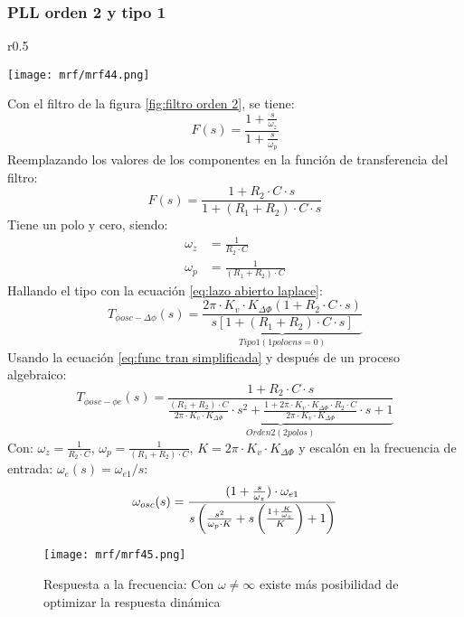 \documentclass[
	12pt, %
	fleqn, %
	a4paper, %
	oneside, %
]{LegrandOrangeBook}
\begin{document}
\subsubsection{PLL orden 2 y tipo 1}
\begin{wrapfigure}{r}{0.5\linewidth}
  \begin{center}
    \texttt{[image: mrf/mrf44.png]}
  \end{center}
  \caption{Filtro orden 2.}
  \label{fig:filtro orden 2}
\end{wrapfigure}
Con el filtro de la figura \ref{fig:filtro orden 2}, se tiene:
\begin{displaymath}
F(s)=\frac{1+\frac{s}{\omega_z}}{1+\frac{s}{\omega_p}}
\end{displaymath}
Reemplazando los valores de los componentes en la función de transferencia del filtro:
\begin{displaymath}
F(s)=\frac{1+R_2\cdot C\cdot s}{1+(R_1+R_2)\cdot C\cdot s}
\end{displaymath}
Tiene un polo y cero, siendo:
\begin{align*}
\omega_z&=\frac{1}{R_2\cdot C}\\
\omega_p&=\frac{1}{(R_1+R_2)\cdot C}
\end{align*}
Hallando el tipo con la ecuación \ref{eq:lazo abierto laplace}:
\begin{displaymath}
T_{\phi osc-\Delta\phi}(s)=\underbrace{\frac{2\pi\cdot K_v\cdot K_{\Delta\Phi}(1+R_2\cdot C\cdot s)}{s\left[1+(R_1+R_2)\cdot C\cdot s\right]}}_{Tipo 1 (1 polo en s=0)}
\end{displaymath}
Usando la ecuación \ref{eq:func tran simplificada} y después de un proceso algebraico:
\begin{displaymath}
T_{\phi osc-\phi e}(s)=\underbrace{\frac{1+R_2\cdot C\cdot s}{\frac{(R_1+R_2)\cdot C}{2\pi\cdot K_v\cdot K_{\Delta\Phi}}\cdot s^2+\frac{1+2\pi\cdot K_v\cdot K_{\Delta\Phi}\cdot R_2\cdot C}{2\pi\cdot K_v\cdot K_{\Delta\Phi}}\cdot s+1}}_{Orden 2(2 polos)}
\end{displaymath}
Con: $\omega_z=\frac{1}{R_2\cdot C}$, $\omega_p=\frac{1}{(R_1+R_2)\cdot C}$, $K=2\pi\cdot K_v\cdot K_{\Delta\Phi}$ y escalón en la frecuencia de entrada: $\omega_e(s)=\omega_{e1}/s$:
\begin{displaymath}
\omega_{osc}(s)=\frac{(1+\frac{s}{\omega_z})\cdot\omega_{e1}}{s\left(\frac{s^2}{\omega_p\cdot K}+s\left(\frac{1+\frac{K}{\omega_z}}{K}\right)+1\right)}
\end{displaymath}
\begin{figure}[H]
\centering
\texttt{[image: mrf/mrf45.png]}
\caption{Respuesta a la frecuencia: Con $\omega\neq\infty$ existe más posibilidad de optimizar la respuesta dinámica}
\end{figure}
\end{document}
